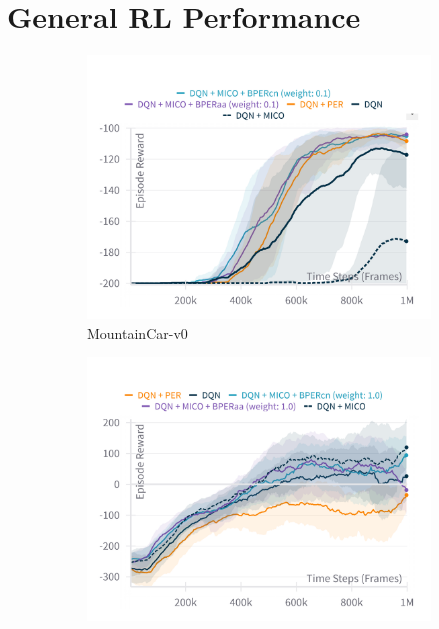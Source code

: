 \section{General RL Performance}


\begin{figure}[h]
    \centering
    \begin{subfigure}{0.45\textwidth}
    \includegraphics[width=\linewidth]{Results/general_results/episode_reward_mountaincarv0.png}
        \caption{MountainCar-v0}
        \label{fig:on_policy_weighting}
    \end{subfigure}
    \hfill
    \begin{subfigure}{0.45\textwidth}
        \includegraphics[width=\linewidth]{Results/general_results/episode_reward_lunarlander.png}

\end{subfigure}
\end{figure}
